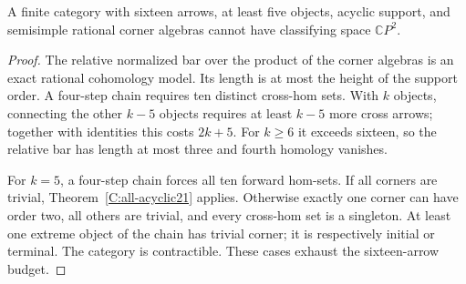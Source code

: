 \begin{lemma}
\label{C:sixteen-high-semisimple}
A finite category with sixteen arrows, at least five objects,
acyclic support, and semisimple rational corner algebras
cannot have classifying space $\mathbb CP^2$.
\end{lemma}
\begin{proof}
The relative normalized bar over the product of the corner
algebras is an exact rational cohomology model.  Its length
is at most the height of the support order.  A four-step
chain requires ten distinct cross-hom sets.  With $k$ objects,
connecting the other $k-5$ objects requires at least $k-5$
more cross arrows; together with identities this costs
$2k+5$.  For $k\geq6$ it exceeds sixteen, so the relative
bar has length at most three and fourth homology vanishes.

For $k=5$, a four-step chain forces all ten forward hom-sets.
If all corners are trivial, Theorem~\ref{C:all-acyclic21}
applies.  Otherwise exactly one corner can have order two,
all others are trivial, and every cross-hom set is a singleton.
At least one extreme object of the chain has trivial corner;
it is respectively initial or terminal.  The category is
contractible.  These cases exhaust the sixteen-arrow budget.
\end{proof}

